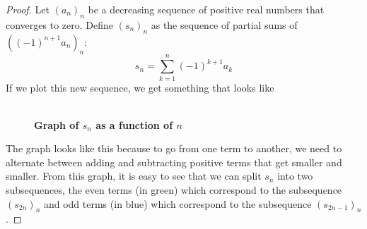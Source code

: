 \documentclass[12pt]{article}
\theoremstyle{definition}
\begin{document}
\begin{proof}
    Let $(a_n)_n$ be a decreasing sequence of positive real numbers that converges to zero. Define $(s_n)_n$ as the sequence of partial sums of $((-1)^{n+1}a_n)_n$:
    $$s_n = \sum_{k=1}^{n}(-1)^{k+1}a_k$$
    If we plot this new sequence, we get something that looks like
    \begin{figure}[h]
        \centering
        \\ \textbf{Graph of $s_n$ as a function of $n$}
    \end{figure}

    The graph looks like this because to go from one term to another, we need to alternate between adding and subtracting positive terms that get smaller and smaller. From this graph, it is easy to see that we can split $s_n$ into two subsequences, the even terms (in green) which correspond to the subsequence $(s_{2n})_n$ and odd terms (in blue) which correspond to the subsequence $(s_{2n-1})_n$.


\end{proof}
\end{document}
